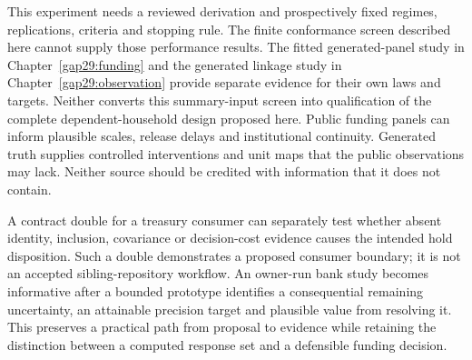 This experiment needs a reviewed derivation and prospectively fixed
regimes, replications, criteria and stopping rule. The finite conformance screen described here cannot supply those performance results. The fitted generated-panel study in Chapter~\ref{gap29:funding} and the generated linkage study in Chapter~\ref{gap29:observation} provide separate evidence for their own laws and targets. Neither converts this summary-input screen into qualification of the complete dependent-household design proposed here. Public funding
panels can inform plausible scales, release delays and institutional
continuity. Generated truth supplies controlled interventions and unit maps
that the public observations may lack. Neither source should be credited
with information that it does not contain.

A contract double for a treasury consumer can separately test whether absent
identity, inclusion, covariance or decision-cost evidence causes the intended
hold disposition. Such a double demonstrates a proposed consumer boundary;
it is not an accepted sibling-repository workflow. An owner-run bank study
becomes informative after a bounded prototype identifies a consequential
remaining uncertainty, an attainable precision target and plausible value
from resolving it. This preserves a practical path from proposal to evidence
while retaining the distinction between a computed response set and a
defensible funding decision.
\label{exec13:funding-journey-end}
